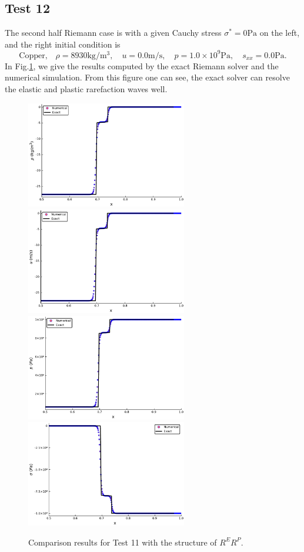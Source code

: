 \documentclass[review]{elsarticle}
\numberwithin{equation}{section}
\numberwithin{table}{section}
\begin{document}
\subsection{Test 12}
The second half Riemann case is with a given Cauchy stress $\sigma^* = 0 \text{Pa}$ on the left, and the right initial condition is
\begin{equation}
  \text{Copper,}\quad\rho = 8930\text{kg}/\text{m}^3, \quad  u = 0.0\text{m}/\text{s}, \quad  p =1.0\times 10^9 \text{Pa}, \quad  s_{xx}=0.0\text{Pa}.
\end{equation}
In Fig.\ref{fig:case10}, we give the results computed by the exact Riemann solver and the numerical simulation. From this figure one can see, the exact solver can resolve the elastic and plastic rarefaction waves well.
\begin{figure}[ht]
  \centering
 \includegraphics[width= 7cm] {case11rho.pdf}
  \includegraphics[width= 7cm] {case11u.pdf}
  \includegraphics[width= 7cm] {case11p.pdf}
  \includegraphics[width= 7cm] {case11sigma.pdf}
    \caption{Comparison results for Test 11 with the structure of $R^ER^P$.  }
  \label{fig:case10}
\end{figure}
\end{document}
